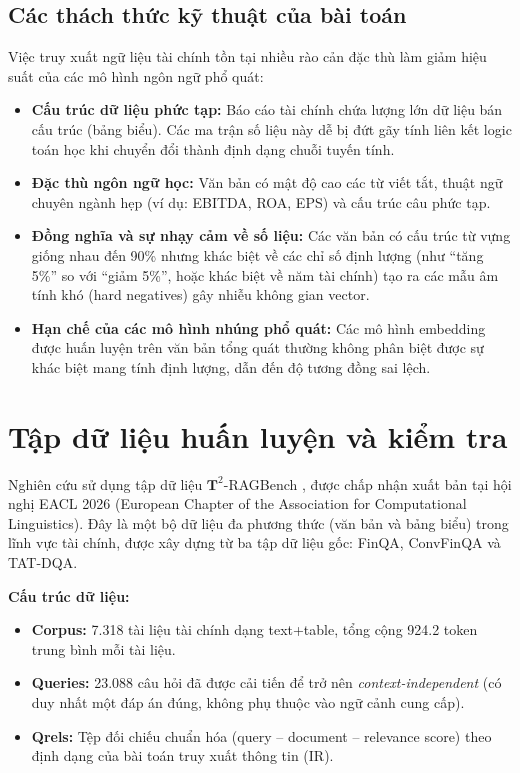\documentclass[12pt,a4paper]{article}
\begin{document}
\subsection{Các thách thức kỹ thuật của bài toán}

Việc truy xuất ngữ liệu tài chính tồn tại nhiều rào cản đặc thù làm giảm hiệu suất của các mô hình ngôn ngữ phổ quát:

\begin{itemize}
    \item \textbf{Cấu trúc dữ liệu phức tạp:} Báo cáo tài chính chứa lượng lớn dữ liệu bán cấu trúc (bảng biểu). Các ma trận số liệu này dễ bị đứt gãy tính liên kết logic toán học khi chuyển đổi thành định dạng chuỗi tuyến tính.
    \item \textbf{Đặc thù ngôn ngữ học:} Văn bản có mật độ cao các từ viết tắt, thuật ngữ chuyên ngành hẹp (ví dụ: EBITDA, ROA, EPS) và cấu trúc câu phức tạp.
    \item \textbf{Đồng nghĩa và sự nhạy cảm về số liệu:} Các văn bản có cấu trúc từ vựng giống nhau đến 90\% nhưng khác biệt về các chỉ số định lượng (như “tăng 5\%” so với “giảm 5\%”, hoặc khác biệt về năm tài chính) tạo ra các mẫu âm tính khó (hard negatives) gây nhiễu không gian vector.
    \item \textbf{Hạn chế của các mô hình nhúng phổ quát:} Các mô hình embedding được huấn luyện trên văn bản tổng quát thường không phân biệt được sự khác biệt mang tính định lượng, dẫn đến độ tương đồng sai lệch.
\end{itemize}

\section{Tập dữ liệu huấn luyện và kiểm tra}

Nghiên cứu sử dụng tập dữ liệu $\mathbf{T}^2$-RAGBench \cite{strich2026t2ragbench}, được chấp nhận xuất bản tại hội nghị EACL 2026 (European Chapter of the Association for Computational Linguistics). Đây là một bộ dữ liệu đa phương thức (văn bản và bảng biểu) trong lĩnh vực tài chính, được xây dựng từ ba tập dữ liệu gốc: FinQA, ConvFinQA và TAT-DQA.

\textbf{Cấu trúc dữ liệu:}
\begin{itemize}
    \item \textbf{Corpus:} 7.318 tài liệu tài chính dạng text+table, tổng cộng 924.2 token trung bình mỗi tài liệu.
    \item \textbf{Queries:} 23.088 câu hỏi đã được cải tiến để trở nên \textit{context-independent} (có duy nhất một đáp án đúng, không phụ thuộc vào ngữ cảnh cung cấp).
    \item \textbf{Qrels:} Tệp đối chiếu chuẩn hóa (query – document – relevance score) theo định dạng của bài toán truy xuất thông tin (IR).
\end{itemize}
\end{document}
